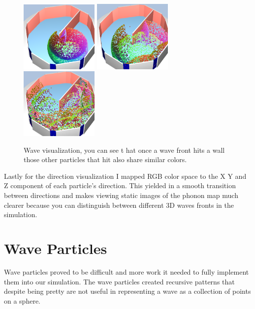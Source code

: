 \documentclass{thesis}
\begin{document}
    \begin{figure}
        \centering
        \includegraphics[width=1.5in]{images/wave_1}
        \includegraphics[width=1.5in]{images/wave_2}
                \includegraphics[width=1.5in]{images/wave_3}
        \caption{Wave visualization, you can see t
        hat once a wave front hits a wall those other particles that hit also share similar colors.}
    \end{figure}
    
    
Lastly for the direction visualization I mapped RGB color space to the X Y and Z component of each particle's direction. This yielded in a smooth transition between directions and makes viewing static images of the phonon map much clearer because you can distinguish between different 3D waves fronts  in the simulation. 

\section{Wave Particles}
Wave particles proved to be difficult and more work it needed to fully implement them into our simulation. The wave particles created recursive patterns that despite being pretty are not useful in representing a wave as a collection of points on a sphere.


\end{document}
